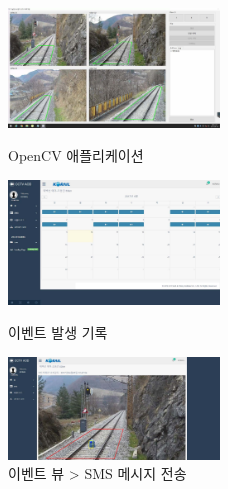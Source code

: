 \begin{itemize}[label=]
\begin{itemize}[label=]
	      \end{itemize}
	      \begin{figure}[!ht]
		      \begin{fullwidth}
			      \parbox{0.5\textwidth}{
				      \centering
				      \includegraphics[width=0.5\textwidth]{images/korail_aod_01.jpg}
				      \caption*{OpenCV 애플리케이션}
			      }\qquad
			      \parbox{0.5\textwidth}{
				      \centering
				      \includegraphics[width=0.5\textwidth]{images/korail_aod_02.jpg}
				      \caption*{이벤트 발생 기록}
			      }\qquad
			      \parbox{0.5\textwidth}{
				      \centering
				      \includegraphics[width=0.5\textwidth]{images/korail_aod_03_01.png}
				      \caption*{이벤트 뷰 > SMS 메시지 전송}
			      }
		      \end{fullwidth}
	      \end{figure}
\end{itemize}

\divider



